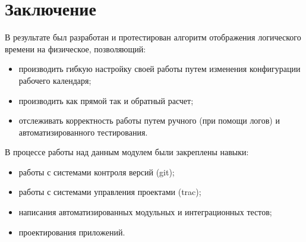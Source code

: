 \section*{Заключение}
\indent В результате был разработан и протестирован алгоритм отображения логического времени на физическое, позволяющий:
\begin{itemize}
	\item производить гибкую настройку своей работы путем изменения конфигурации рабочего календаря;
	\item производить как прямой так и обратный расчет;
	\item отслеживать корректность работы путем ручного (при помощи логов) и автоматизированного тестирования.
\end{itemize}
\indent В процессе работы над данным модулем были закреплены навыки:
\begin{itemize}
	\item работы с системами контроля версий (git);
	\item работы с системами управления проектами (trac);
	\item написания автоматизированных модульных и интеграционных тестов;
	\item проектирования приложений.
\end{itemize}
